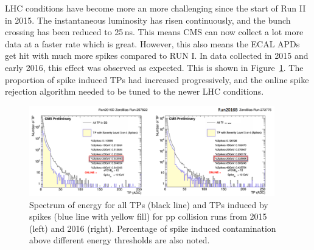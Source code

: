 LHC conditions have become more an more challenging since the start of Run II in 2015. The instantaneous luminosity has risen continuously, and the bunch crossing has been reduced to 25\,ns. This means CMS can now collect a lot more data at a faster rate which is great. However, this also means the ECAL APDs get hit with much more spikes compared to RUN I. In data collected in 2015 and early 2016, this effect was observed as expected. This is shown in Figure~\ref{fig:spike_fraction}. The proportion of spike induced TPs had increased progressively, and the online spike rejection algorithm needed to be tuned to the newer LHC conditions.    


\begin{figure}
\begin{center}
  \includegraphics[width=0.95\textwidth,keepaspectratio]{plots_and_figures/chapter3/spike_fraction.png}
\caption{Spectrum of energy for all TPs (black line) and TPs induced by spikes (blue line with yellow fill) for pp collision runs from 2015 (left) and 2016 (right). Percentage of spike induced contamination above different energy thresholds are also noted.}
\label{fig:spike_fraction}
\end{center}
\end{figure}

